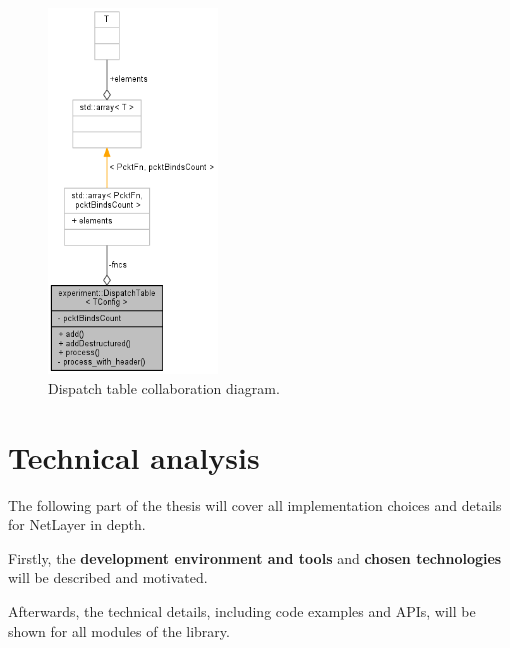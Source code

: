 \documentclass[12pt]{report}
\newcommand{\+}{\discretionary{\mbox{\scriptsize$\hookleftarrow$}}{}{}}
\renewcommand\emph{\textbf}
\begin{document}
                \begin{figure}[H]
                \caption{Dispatch table collaboration diagram.}
                \centering
                \includegraphics[width=0.4\textwidth]{d/coll/coll_disptab.png}
                \end{figure}

                \newpage                




\part{Technical analysis}
        The following part of the thesis will cover all implementation choices and details for NetLayer in depth.

        Firstly, the \emph{development environment and tools} and \emph{chosen technologies} will be described and motivated.

        Afterwards, the technical details, including code examples and APIs, will be shown for all modules of the library.
\end{document}

